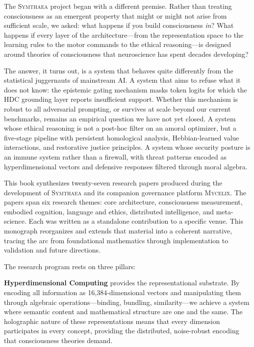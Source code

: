 \documentclass[12pt]{book}
\newcommand{\symthaea}{\textsc{Symthaea}}
\newcommand{\mycelix}{\textsc{Mycelix}}
\begin{document}
The \symthaea{} project began with a different premise. Rather than treating consciousness as an emergent property that might or might not arise from sufficient scale, we asked: what happens if you build consciousness \textit{in}? What happens if every layer of the architecture---from the representation space to the learning rules to the motor commands to the ethical reasoning---is designed around theories of consciousness that neuroscience has spent decades developing?

The answer, it turns out, is a system that behaves quite differently from the statistical juggernauts of mainstream AI. A system that aims to refuse what it does not know: the epistemic gating mechanism masks token logits for which the HDC grounding layer reports insufficient support. Whether this mechanism is robust to all adversarial prompting, or survives at scale beyond our current benchmarks, remains an empirical question we have not yet closed. A system whose ethical reasoning is not a post-hoc filter on an amoral optimizer, but a five-stage pipeline with persistent homological analysis, Hebbian-learned value interactions, and restorative justice principles. A system whose security posture is an immune system rather than a firewall, with threat patterns encoded as hyperdimensional vectors and defensive responses filtered through moral algebra.

This book synthesizes twenty-seven research papers produced during the development of \symthaea{} and its companion governance platform \mycelix{}. The papers span six research themes: core architecture, consciousness measurement, embodied cognition, language and ethics, distributed intelligence, and meta-science. Each was written as a standalone contribution to a specific venue. This monograph reorganizes and extends that material into a coherent narrative, tracing the arc from foundational mathematics through implementation to validation and future directions.

The research program rests on three pillars:

\textbf{Hyperdimensional Computing} provides the representational substrate. By encoding all information as 16,384-dimensional vectors and manipulating them through algebraic operations---binding, bundling, similarity---we achieve a system where semantic content and mathematical structure are one and the same. The holographic nature of these representations means that every dimension participates in every concept, providing the distributed, noise-robust encoding that consciousness theories demand.
\end{document}
